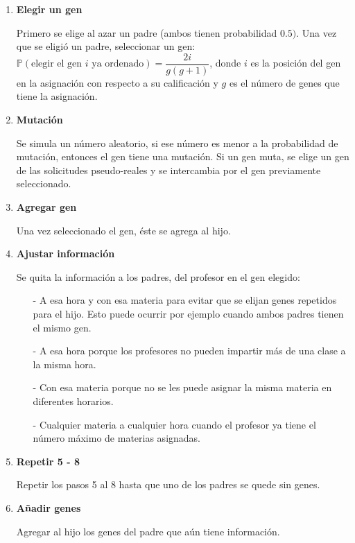 \begin{enumerate}
\item \textbf{Elegir un gen}

Primero se elige al azar un padre (ambos tienen probabilidad $0.5)$. Una vez que se eligió un padre, seleccionar un gen: $\mathbb{P}(\text{elegir el gen } i \text{ ya ordenado}) = \dfrac{2i}{g(g+1)}$, donde $i$ es la posición del gen en la asignación con respecto a su calificación y $g$ es el número de genes que tiene la asignación.

\item \textbf{Mutación}

Se simula un número aleatorio, si ese número es menor a la probabilidad de mutación, entonces el gen tiene una mutación. Si un gen muta, se elige un gen de las solicitudes pseudo-reales y se intercambia por el gen previamente seleccionado.

\item \textbf{Agregar gen}

Una vez seleccionado el gen, éste se agrega al hijo.

\item \textbf{Ajustar información}

Se quita la información a los padres, del profesor en el gen elegido:

\begin{itemize}
\item[-] A esa hora y con esa materia para evitar que se elijan genes repetidos para el hijo. Esto puede ocurrir por ejemplo cuando ambos padres tienen el mismo gen.

\item[-] A esa hora porque los profesores no pueden impartir más de una clase a la misma hora.

\item[-] Con esa materia porque no se les puede asignar la misma materia en diferentes horarios.

\item[-] Cualquier materia a cualquier hora cuando el profesor ya tiene el número máximo de materias asignadas.
\end{itemize}

\item \textbf{Repetir 5 - 8}

Repetir los pasos 5 al 8 hasta que uno de los padres se quede sin genes.

\item \textbf{Añadir genes}

Agregar al hijo los genes del padre que aún tiene información.


\end{enumerate}
